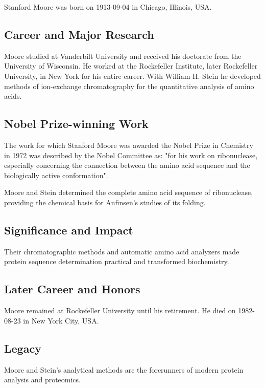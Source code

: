 Stanford Moore was born on 1913-09-04 in Chicago, Illinois, USA.

\subsection*{Career and Major Research}

Moore studied at Vanderbilt University and received his doctorate from the University of Wisconsin. He worked at the Rockefeller Institute, later Rockefeller University, in New York for his entire career. With William H. Stein he developed methods of ion-exchange chromatography for the quantitative analysis of amino acids.

\subsection*{Nobel Prize-winning Work}

The work for which Stanford Moore was awarded the Nobel Prize in Chemistry in 1972 was described by the Nobel Committee as: "for his work on ribonuclease, especially concerning the connection between the amino acid sequence and the biologically active conformation".

Moore and Stein determined the complete amino acid sequence of ribonuclease, providing the chemical basis for Anfinsen's studies of its folding.

\subsection*{Significance and Impact}

Their chromatographic methods and automatic amino acid analyzers made protein sequence determination practical and transformed biochemistry.

\subsection*{Later Career and Honors}

Moore remained at Rockefeller University until his retirement. He died on 1982-08-23 in New York City, USA.

\subsection*{Legacy}

Moore and Stein's analytical methods are the forerunners of modern protein analysis and proteomics.

